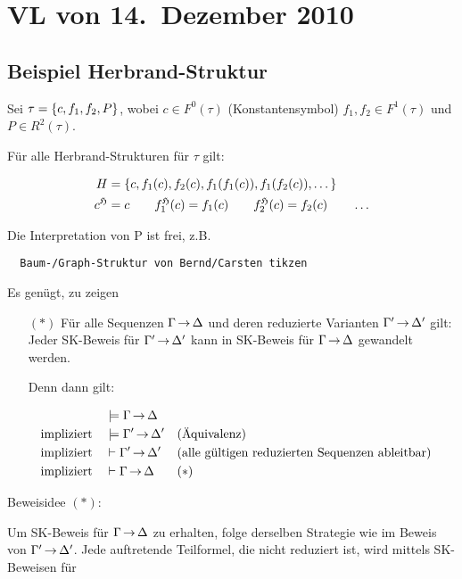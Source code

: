 \section{VL von 14.~Dezember 2010}

\subsection{Beispiel Herbrand-Struktur}

Sei $\tau = \left\{c, f_1, f_2, P\right\}$, wobei $c\in F^0(\tau)$ (Konstantensymbol)
$f_1,f_2 \in F^1(\tau)$ und $P \in R^2(\tau)$.

Für alle Herbrand-Strukturen für $\tau$ gilt:

\begin{align*}
  H &= \left\{c, f_1(c), f_2(c), f_1(f_1(c)), f_1(f_2(c)), \dots\right\} \\
  c^{\mathfrak{H}} &= c \qquad f_1^{\mathfrak{H}}(c) = f_1(c) \qquad f_2^{\mathfrak{H}}(c) = f_2(c) \qquad \dots
\end{align*}

Die Interpretation von P ist frei, z.B.

\begin{verbatim}
  Baum-/Graph-Struktur von Bernd/Carsten tikzen
\end{verbatim}

Es genügt, zu zeigen

\begin{itemize}
  \item[$(*)$] Für alle Sequenzen $\Gamma\operatorname{\rightarrow}\Delta$ und deren reduzierte Varianten
  $\Gamma'\operatorname{\rightarrow}\Delta'$ gilt: Jeder SK-Beweis für $\Gamma'\operatorname{\rightarrow}\Delta'$ kann in SK-Beweis
  für $\Gamma\operatorname{\rightarrow}\Delta$ gewandelt werden.
  
  Denn dann gilt:
  
  \begin{align*}
                            &\models\Gamma \operatorname{\rightarrow}\Delta \\
    \text{impliziert} \quad &\models\Gamma'\operatorname{\rightarrow}\Delta' && \text{(Äquivalenz)} \\
    \text{impliziert} \quad &\vdash \Gamma'\operatorname{\rightarrow}\Delta' && \text{(alle gültigen reduzierten Sequenzen ableitbar)} \\
    \text{impliziert} \quad &\vdash \Gamma \operatorname{\rightarrow}\Delta  && (*)
  \end{align*}
\end{itemize}

Beweisidee $(*)$:

Um SK-Beweis für $\Gamma\operatorname{\rightarrow}\Delta$ zu erhalten, folge derselben Strategie wie im
Beweis von $\Gamma'\operatorname{\rightarrow}\Delta'$. Jede auftretende Teilformel, die nicht reduziert
ist, wird mittels SK-Beweisen für

